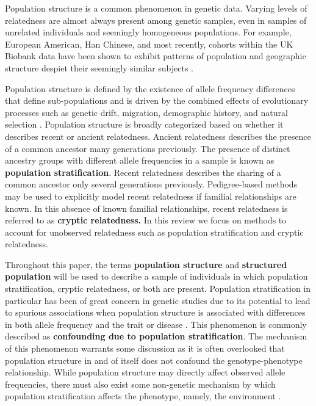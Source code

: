 Population structure is a common phenomenon in genetic data. Varying levels of relatedness are almost always present among genetic samples, even in samples of unrelated individuals and seemingly homogeneous populations. For example, European American, Han Chinese, and most recently, cohorts within the UK Biobank data have been shown to exhibit patterns of population and geographic structure despiet their seemingly similar subjects \citep{campbell2005demonstrating, xu2009genomic, chen2009genetic, haworth2019apparent}.

Population structure is defined by the existence of allele frequency differences that define sub-populations and is driven by the combined effects of evolutionary processes such as genetic drift, migration, demographic history, and natural selection \citep{gibson2015primer, tibayrenc2017genetics}. Population structure is broadly categorized based on whether it describes recent or ancient relatedness. Ancient relatedness describes the presence of a common ancestor many generations previously. The presence of distinct ancestry groups with different allele frequencies in a sample is known as \textbf{population stratification}. Recent relatedness describes the sharing of a common ancestor only several generations previously. Pedigree-based methods may be used to explicitly model recent relatedness if familial relationships are known. In this absence of known familial relationships, recent relatedness is referred to as \textbf{cryptic relatedness.} In this review we focus on methods to account for unobserved relatedness such as population stratification and cryptic relatedness. 

Throughout this paper, the terms \textbf{population structure} and \textbf{structured population} will be used to describe a sample of individuals in which population stratification, cryptic relatedness, or both are present. Population stratification in particular has been of great concern in genetic studies due to its potential to lead to spurious associations when population structure is associated with differences in both allele frequency and the trait or disease \citep{gibson2015primer}. This phenomenon is commonly described as \textbf{confounding due to population stratification}. The mechanism of this phenomenon warrants some discussion as it is often overlooked that population structure in and of itself does not confound the genotype-phenotype relationship. While population structure may directly affect observed allele frequencies, there must also exist some non-genetic mechanism by which population stratification affects the phenotype, namely, the environment \citep{barton2019population, vilhjalmsson2012nature}.


